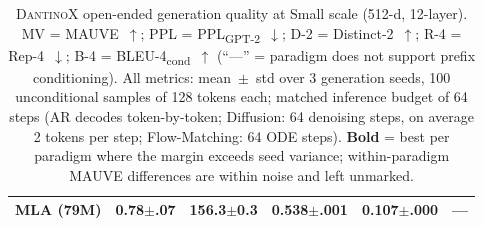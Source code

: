 \begin{table}[t]
\begin{tabular}{@{} l rrrrr @{}}
\quad MLA (79M)  & 0.78{\tiny$\pm$.07} & \textbf{156.3}{\tiny$\pm$0.3} & 0.538{\tiny$\pm$.001}          & 0.107{\tiny$\pm$.000}          & --- \\
\bottomrule
\end{tabular}
\caption{%
  \textsc{DantinoX} open-ended generation quality at Small scale
  (512-d, 12-layer).
  MV = MAUVE~$\uparrow$; PPL = PPL\textsubscript{GPT-2}~$\downarrow$;
  D-2 = Distinct-2~$\uparrow$; R-4 = Rep-4~$\downarrow$;
  B-4 = BLEU-4\textsubscript{cond}~$\uparrow$
  (``---'' = paradigm does not support prefix conditioning).
  All metrics: mean~$\pm$~std over 3 generation seeds, 100 unconditional
  samples of 128 tokens each; matched inference budget of 64 steps
  (AR decodes token-by-token; Diffusion: 64 denoising steps, on average
  2 tokens per step; Flow-Matching: 64 ODE steps).
  \textbf{Bold} = best per paradigm where the margin exceeds seed
  variance; within-paradigm MAUVE differences are within noise and
  left unmarked.%
}
\label{tab:genquality}
\end{table}
